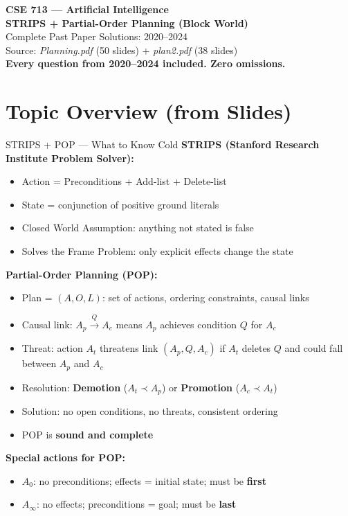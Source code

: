 \documentclass[12pt,a4paper]{article}
\begin{document}
\begin{center}
{\LARGE\bfseries\color{planblue} CSE 713 --- Artificial Intelligence}\\[4pt]
{\large\bfseries STRIPS + Partial-Order Planning (Block World)}\\[2pt]
{\large Complete Past Paper Solutions: 2020--2024}\\[6pt]
{\normalsize Source: \textit{Planning.pdf} (50 slides) + \textit{plan2.pdf} (38 slides)}\\[2pt]
{\normalsize\color{darkred}\textbf{Every question from 2020--2024 included. Zero omissions.}}
\end{center}

\tableofcontents
\newpage

\section*{Topic Overview (from Slides)}

\begin{keybox}{STRIPS + POP --- What to Know Cold}
\textbf{STRIPS (Stanford Research Institute Problem Solver):}
\begin{itemize}[noitemsep]
  \item Action = Preconditions + Add-list + Delete-list
  \item State = conjunction of positive ground literals
  \item Closed World Assumption: anything not stated is false
  \item Solves the Frame Problem: only explicit effects change the state
\end{itemize}
\vspace{4pt}
\textbf{Partial-Order Planning (POP):}
\begin{itemize}[noitemsep]
  \item Plan = $(A, O, L)$: set of actions, ordering constraints, causal links
  \item Causal link: $A_p \xrightarrow{Q} A_c$ means $A_p$ achieves condition $Q$ for $A_c$
  \item Threat: action $A_t$ threatens link $(A_p, Q, A_c)$ if $A_t$ deletes $Q$ and could fall between $A_p$ and $A_c$
  \item Resolution: \textbf{Demotion} ($A_t \prec A_p$) or \textbf{Promotion} ($A_c \prec A_t$)
  \item Solution: no open conditions, no threats, consistent ordering
  \item POP is \textbf{sound and complete}
\end{itemize}
\vspace{4pt}
\textbf{Special actions for POP:}
\begin{itemize}[noitemsep]
  \item $A_0$: no preconditions; effects = initial state; must be \textbf{first}
  \item $A_\infty$: no effects; preconditions = goal; must be \textbf{last}
\end{itemize}
\end{keybox}
\end{document}
